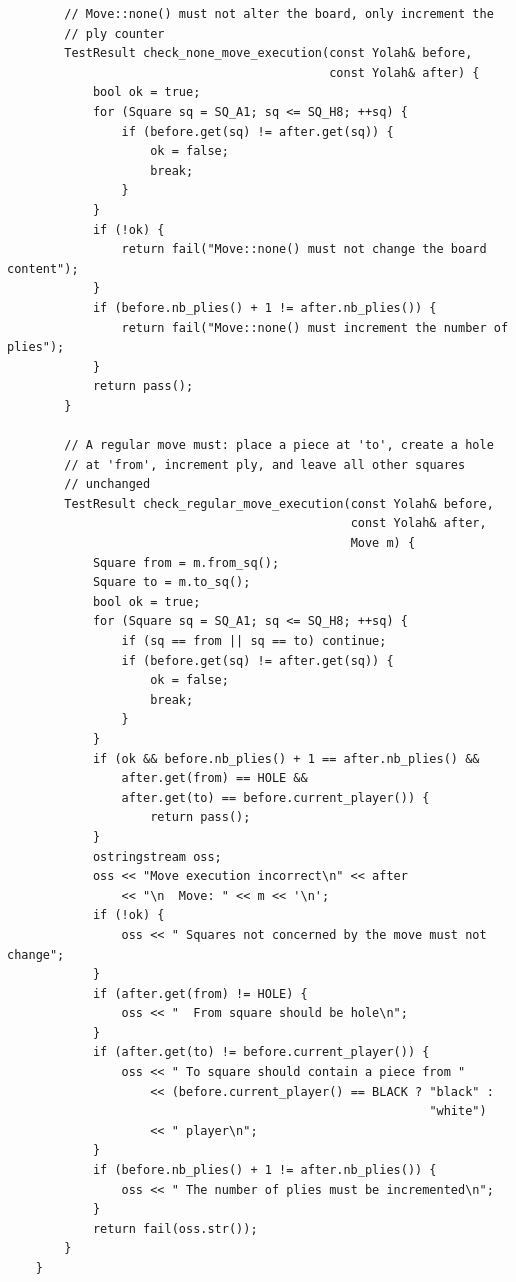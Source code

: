 \documentclass[12pt,a4paper,twoside,openright]{book}
\begin{document}
\begin{mdframed}[skipabove=\baselineskip,topline=false,rightline=false,bottomline=false,leftline=false,linewidth=1pt,linecolor=gray!40,innerleftmargin=8pt]
\begin{verbatim}
        // Move::none() must not alter the board, only increment the 
        // ply counter
        TestResult check_none_move_execution(const Yolah& before, 
                                             const Yolah& after) {
            bool ok = true;
            for (Square sq = SQ_A1; sq <= SQ_H8; ++sq) {
                if (before.get(sq) != after.get(sq)) {
                    ok = false;
                    break;
                }
            }
            if (!ok) {
                return fail("Move::none() must not change the board content");
            }
            if (before.nb_plies() + 1 != after.nb_plies()) {
                return fail("Move::none() must increment the number of plies");
            }
            return pass();
        }

        // A regular move must: place a piece at 'to', create a hole 
        // at 'from', increment ply, and leave all other squares 
        // unchanged
        TestResult check_regular_move_execution(const Yolah& before, 
                                                const Yolah& after, 
                                                Move m) {
            Square from = m.from_sq();
            Square to = m.to_sq();
            bool ok = true;
            for (Square sq = SQ_A1; sq <= SQ_H8; ++sq) {
                if (sq == from || sq == to) continue;
                if (before.get(sq) != after.get(sq)) {
                    ok = false;
                    break;
                }
            }
            if (ok && before.nb_plies() + 1 == after.nb_plies() &&
                after.get(from) == HOLE && 
                after.get(to) == before.current_player()) {
                    return pass();
            }
            ostringstream oss;
            oss << "Move execution incorrect\n" << after 
                << "\n  Move: " << m << '\n';
            if (!ok) {
                oss << " Squares not concerned by the move must not change";
            }
            if (after.get(from) != HOLE) {
                oss << "  From square should be hole\n";
            }
            if (after.get(to) != before.current_player()) {
                oss << " To square should contain a piece from " 
                    << (before.current_player() == BLACK ? "black" : 
                                                           "white") 
                    << " player\n";
            }
            if (before.nb_plies() + 1 != after.nb_plies()) {
                oss << " The number of plies must be incremented\n";
            }
            return fail(oss.str());
        }
    }


\end{verbatim}
\end{mdframed}
\end{document}

